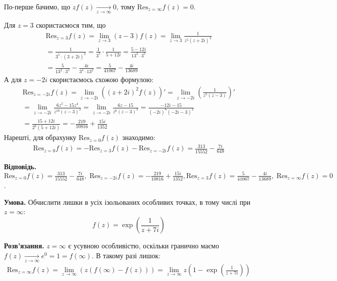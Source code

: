 \documentclass[oneside,solution]{karazin-complan-assign}
\begin{document}
По-перше бачимо, що $zf(z) \xrightarrow[z \to \infty]{}0$, тому $\text{Res}_{z=\infty}f(z)=0$. 

Для $z=3$ скористаємося тим, що
\begin{gather}
    \text{Res}_{z=3}f(z) = \lim_{z \to 3}(z-3)f(z) = \lim_{z \to 3}\frac{1}{z^5(z+2i)^2} \nonumber \\ 
    = \frac{1}{3^5 \cdot (3+2i)^2} = \frac{1}{3^5} \cdot \frac{1}{5+12i} = \frac{5-12i}{13^2 \cdot 3^5} \nonumber \\ = \frac{5}{13^2 \cdot 3^5} - \frac{4i}{3^4 \cdot 13^2} = \frac{5}{41067} - \frac{4i}{13689}
\end{gather}
А для $z=-2i$ скористаємось схожою формулою:
\begin{gather}
    \text{Res}_{z=-2i}f(z) = \lim_{z \to -2i}((z+2i)^2f(z))' = \lim_{z \to -2i}\left(\frac{1}{z^5(z-3)}\right)' \nonumber \\
    = \lim_{z \to -2i} \frac{6z^5-15z^4}{z^{10}(z-3)^2} = \lim_{z \to -2i} \frac{6z-15}{z^6(z-3)^2} = \frac{-12i-15}{(-2i)^6(-2i-3)^2} \nonumber \\
    = \frac{15+12i}{2^6(5+12i)} = -\frac{219}{10816} + \frac{15i}{1352}
\end{gather}
Нарешті, для обрахунку $\text{Res}_{z=0}f(z)$ знаходимо:
\begin{gather}
    \text{Res}_{z=0}f(z) = -\text{Res}_{z=3}f(z) - \text{Res}_{z=-2i}f(z) = \frac{313}{15552} - \frac{7i}{648}
\end{gather}

\textbf{Відповідь.} $\text{Res}_{z=0}f(z)=\frac{313}{15552} - \frac{7i}{648},\;\text{Res}_{z=-2i}f(z)=-\frac{219}{10816} + \frac{15i}{1352},\text{Res}_{z=3}f(z)=\frac{5}{41067} - \frac{4i}{13689},\;\text{Res}_{z=\infty}f(z)=0$.

\problem{}

\textbf{Умова.} Обчислити лишки в усіх ізольованих особливих точках, в тому числі при $z=\infty$:
\begin{equation*}
    f(z) = \exp\left(\frac{1}{z+7i}\right)
\end{equation*}

\textbf{Розв'язання.} $z=\infty$ є усувною особливістю, оскільки гранично маємо $f(z) \xrightarrow[z \to \infty]{}e^0 = 1=f(\infty)$. В такому разі лишок:
\begin{gather}
    \text{Res}_{z=\infty}f(z) = \lim_{z \to \infty}\left(z(f(\infty)-f(z))\right) = \lim_{z \to \infty}z\left(1-\exp\left(\frac{1}{z+7i}\right)\right)
\end{gather}
\end{document}
